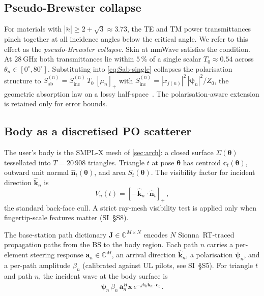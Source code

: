 \documentclass[journal,twocolumn,10pt]{IEEEtran}
\theoremstyle{plain}
\theoremstyle{definition}
\theoremstyle{remark}
\newcommand{\nhat}{\hat{\bm{n}}}
\newcommand{\xx}{\mathbf{x}}
\newcommand{\Sinc}{S_{\mathrm{inc}}}
\newcommand{\Sab}{S_{\mathrm{ab}}}
\newcommand{\Jmat}{\mathbf{J}}
\newcommand{\psin}{\bm{\psi}_n}
\newcommand{\thetab}{\bm{\theta}}
\newcommand{\Tepskin}{T_{0}}
\newcommand{\Complex}{\mathbb{C}}
\newcommand{\ntilde}{\tilde{n}}
\begin{document}
\subsection{Pseudo-Brewster collapse}

For materials with $|\ntilde| \geq 2 + \sqrt{3} \approx 3.73$, the
TE and TM power transmittances pinch together at all incidence
angles below the critical angle. We refer to this effect as the
\emph{pseudo-Brewster collapse}.
Skin at mmWave satisfies the condition. At $28~\mathrm{GHz}$ both
transmittances lie within $5\,\%$ of a single scalar
$\Tepskin \approx 0.54$ across
$\theta_n \in [0^{\circ}, 80^{\circ}]$. Substituting into
\cref{eq:Sab-single} collapses the polarisation structure to
$\Sab^{(n)} = \Sinc^{(n)}\,\Tepskin\,[\mu_n]_+$ with
$\Sinc^{(n)} = |x_{j(n)}|^2\,|\psin|^2 / Z_0$, the geometric
absorption law on a lossy half-space~\cite{BornWolf}. The
polarisation-aware extension is retained only for error bounds.

\subsection{Body as a discretised PO scatterer}

The user's body is the SMPL-X mesh of \cref{sec:arch}: a closed
surface $\Sigma(\thetab)$ tessellated into $T = 20\,908$ triangles.
Triangle $t$ at pose $\thetab$ has centroid $\bm{c}_t(\thetab)$,
outward unit normal $\nhat_t(\thetab)$, and area $S_t(\thetab)$.
The visibility factor for incident direction $\hat{\bm{k}}_n$ is
\begin{equation}\label{eq:visibility}
  V_n(t) = [-\hat{\bm{k}}_n \cdot \nhat_t]_+\,,
\end{equation}
the standard back-face cull. A strict ray-mesh visibility test is
applied only when fingertip-scale features matter
(SI~\S{}S8).

The base-station path dictionary $\Jmat \in \Complex^{M \times N}$
encodes $N$ Sionna~RT-traced propagation paths from the BS to the
body region. Each path $n$ carries a per-element steering response
$\bm{a}_n \in \Complex^{M}$, an arrival direction $\hat{\bm{k}}_n$,
a polarisation $\psin$, and a per-path amplitude $\beta_n$
(calibrated against UL pilots, see SI~\S{}S5). For triangle $t$
and path $n$, the incident wave at the body surface is
\begin{equation}\label{eq:incident-wave}
  \psin\,\beta_n\,\bm{a}_n^{H}\xx\,
  e^{-jk_0 \hat{\bm{k}}_n \cdot \bm{c}_t}\,.
\end{equation}
\end{document}
